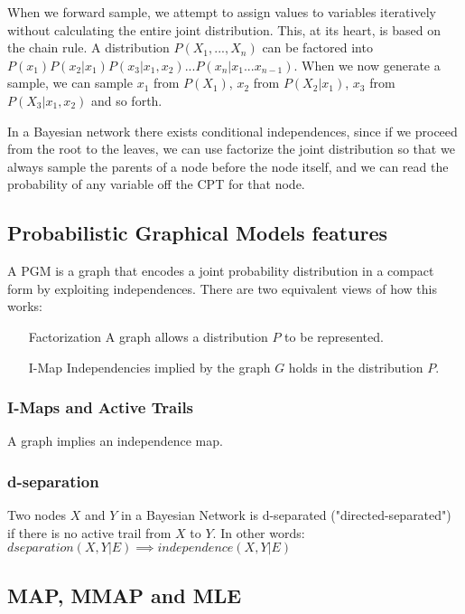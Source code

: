 \documentclass[]{article}
\begin{document}
When we forward sample, we attempt to assign values to variables iteratively without calculating the entire joint distribution. This, at its heart, is based on the chain rule. A distribution $P(X_1, ..., X_n)$ can be factored into $P(x_1)P(x_2|x_1)P(x_3|x_1,x_2) ... P(x_n|x_1 ... x_{n-1})$. When we now generate a sample, we can sample $x_1$ from $P(X_1)$, $x_2$ from $P(X_2|x_1)$, $x_3$ from $P(X_3|x_1, x_2)$ and so forth.

In a Bayesian network there exists conditional independences, since if we proceed from the root to the leaves, we can use factorize the joint distribution so that we always sample the parents of a node before the node itself, and we can read the probability of any variable off the CPT for that node.

\subsection{Probabilistic Graphical Models features}

A PGM is a graph that encodes a joint probability distribution in a compact form by exploiting independences. There are two equivalent views of how this works:
\begin{itemize}
    \item [Factorization] A graph allows a distribution $P$ to be represented.
    \item [I-Map] Independencies implied by the graph $G$ holds in the distribution $P$.
\end{itemize}

\subsubsection{I-Maps and Active Trails}

A graph implies an independence map.

\subsubsection{d-separation}

Two nodes $X$ and $Y$ in a Bayesian Network is d-separated ("directed-separated") if there is no active trail from $X$ to $Y$. In other words: $dseparation(X,Y|E) \implies independence(X,Y|E)$

\subsection{MAP, MMAP and MLE}




\end{document}
